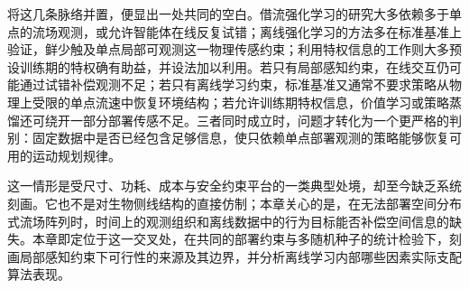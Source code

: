 将这几条脉络并置，便显出一处共同的空白。借流强化学习的研究大多依赖多于单点的流场观测，或允许智能体在线反复试错；离线强化学习的方法多在标准基准上验证，鲜少触及单点局部可观测这一物理传感约束；利用特权信息的工作则大多预设训练期的特权确有助益，并设法加以利用。若只有局部感知约束，在线交互仍可能通过试错补偿观测不足；若只有离线学习约束，标准基准又通常不要求策略从物理上受限的单点流速中恢复环境结构；若允许训练期特权信息，价值学习或策略蒸馏还可绕开一部分部署传感不足。三者同时成立时，问题才转化为一个更严格的判别：固定数据中是否已经包含足够信息，使只依赖单点部署观测的策略能够恢复可用的运动规划规律。

这一情形是受尺寸、功耗、成本与安全约束平台的一类典型处境，却至今缺乏系统刻画。它也不是对生物侧线结构的直接仿制；本章关心的是，在无法部署空间分布式流场阵列时，时间上的观测组织和离线数据中的行为目标能否补偿空间信息的缺失。本章即定位于这一交叉处，在共同的部署约束与多随机种子的统计检验下，刻画局部感知约束下可行性的来源及其边界，并分析离线学习内部哪些因素实际支配算法表现。
